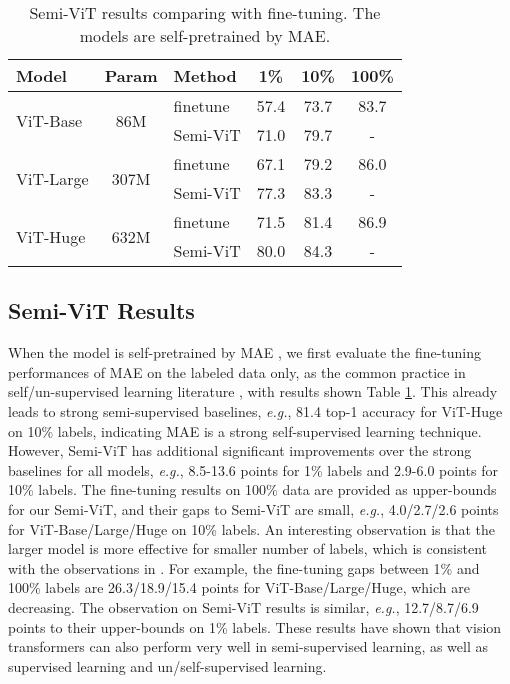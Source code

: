 \documentclass{article}
\newcommand\eg{\emph{e.g.}}
\begin{document}
\setlength{\tabcolsep}{8pt}
\begin{table}[t]
\begin{center}
\small
\begin{tabular}{lclccc}
\toprule
Model &Param & Method & 1\% & 10\% & 100\%\\\hline
\multirow{2}{*}{ViT-Base} &\multirow{2}{*}{86M} &finetune &57.4 &73.7 &83.7 \\
& &Semi-ViT &71.0 &79.7 &- \\\hline
\multirow{2}{*}{ViT-Large} &\multirow{2}{*}{307M} & finetune &67.1 &79.2 &86.0 \\
& &Semi-ViT &77.3 &83.3 &- \\\hline
\multirow{2}{*}{ViT-Huge} &\multirow{2}{*}{632M} & finetune &71.5 &81.4 &86.9 \\
& &Semi-ViT &80.0 &84.3 &- \\
\bottomrule
\end{tabular}
\caption{Semi-ViT results comparing with fine-tuning. The models are self-pretrained by MAE\cite{he2021masked}.}
\label{tab:semi-vit}
\end{center}\vspace{-3mm}
\end{table}



\subsection{Semi-ViT Results}

When the model is self-pretrained by MAE \cite{he2021masked}, we first evaluate the fine-tuning performances of MAE on the labeled data only, as the common practice in self/un-supervised learning literature \cite{DBLP:conf/cvpr/He0WXG20,DBLP:conf/icml/ChenK0H20,DBLP:conf/nips/GrillSATRBDPGAP20}, with results shown Table \ref{tab:semi-vit}. This already leads to strong semi-supervised baselines, \eg, 81.4 top-1 accuracy for ViT-Huge on 10\% labels, indicating MAE is a strong self-supervised learning technique. However, Semi-ViT has additional significant improvements over the strong baselines for all models, \eg, 8.5-13.6 points for 1\% labels and 2.9-6.0 points for 10\% labels. The fine-tuning results on 100\% data are provided as upper-bounds for our Semi-ViT, and their gaps to Semi-ViT are small, \eg, 4.0/2.7/2.6 points for ViT-Base/Large/Huge on 10\% labels. An interesting observation is that the larger model is more effective for smaller number of labels, which is consistent with the observations in \cite{DBLP:conf/nips/ChenKSNH20}. For example, the fine-tuning gaps between 1\% and 100\% labels are 26.3/18.9/15.4 points for ViT-Base/Large/Huge, which are decreasing. The observation on Semi-ViT results is similar, \eg, 12.7/8.7/6.9 points to their upper-bounds on 1\% labels. These results have shown that vision transformers can also perform very well in semi-supervised learning, as well as supervised learning and un/self-supervised learning.  
\end{document}
